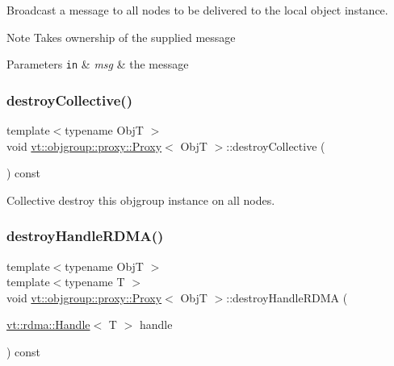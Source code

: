 Broadcast a message to all nodes to be delivered to the local object instance. 

\begin{DoxyNote}{Note}
Takes ownership of the supplied message
\end{DoxyNote}

\begin{DoxyParams}[1]{Parameters}
\mbox{\tt in}  & {\em msg} & the message \\
\hline
\end{DoxyParams}
\mbox{\label{structvt_1_1objgroup_1_1proxy_1_1_proxy_a6758c7979d1f69722449cb78f998cbf1}} 
\subsubsection{\texorpdfstring{destroy\+Collective()}{destroyCollective()}}
{\footnotesize\ttfamily template$<$typename ObjT $>$ \\
void \hyperlink{structvt_1_1objgroup_1_1proxy_1_1_proxy}{vt\+::objgroup\+::proxy\+::\+Proxy}$<$ ObjT $>$\+::destroy\+Collective (\begin{DoxyParamCaption}{ }\end{DoxyParamCaption}) const}



Collective destroy this objgroup instance on all nodes. 

\mbox{\label{structvt_1_1objgroup_1_1proxy_1_1_proxy_a7510598b2915dec55b90bf9ae61c7df9}} 
\subsubsection{\texorpdfstring{destroy\+Handle\+R\+D\+M\+A()}{destroyHandleRDMA()}}
{\footnotesize\ttfamily template$<$typename ObjT $>$ \\
template$<$typename T $>$ \\
void \hyperlink{structvt_1_1objgroup_1_1proxy_1_1_proxy}{vt\+::objgroup\+::proxy\+::\+Proxy}$<$ ObjT $>$\+::destroy\+Handle\+R\+D\+MA (\begin{DoxyParamCaption}\item[{\hyperlink{structvt_1_1rdma_1_1_handle}{vt\+::rdma\+::\+Handle}$<$ T $>$}]{handle }\end{DoxyParamCaption}) const}




